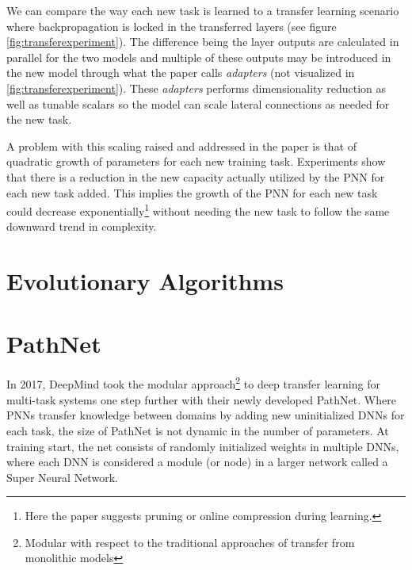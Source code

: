 We can compare the way each new task is learned to a transfer learning scenario where backpropagation is locked in the transferred layers (see figure \ref{fig:transferexperiment}). The difference being the layer outputs are calculated in parallel for the two models and multiple of these outputs may be introduced in the new model through what the paper calls \textit{adapters} (not visualized in \ref{fig:transferexperiment}). These \textit{adapters} performs dimensionality reduction as well as tunable scalars so the model can scale lateral connections as needed for the new task.

A problem with this scaling raised and addressed in the paper is that of quadratic growth of parameters for each new training task. Experiments show that there is a reduction in the new capacity actually utilized by the PNN for each new task added. This implies the growth of the PNN for each new task could decrease exponentially\footnote{Here the paper suggests pruning or online compression during learning.} without needing the new task to follow the same downward trend in complexity. 

\section{Evolutionary Algorithms}



\section{PathNet}

In 2017, DeepMind took the modular approach\footnote{Modular with respect to the traditional approaches of transfer from monolithic models} to deep transfer learning for multi-task systems one step further with their newly developed PathNet\cite{pathnet}. Where PNNs transfer knowledge between domains by adding new uninitialized DNNs for each task, the size of PathNet is not dynamic in the number of parameters. At training start, the net consists of randomly initialized weights in multiple DNNs, where each DNN is considered a module (or node) in a larger network called a Super Neural Network. 

